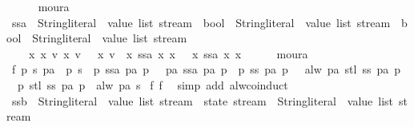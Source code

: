 \begin{isabellebody}
\ \ \ \ \isamarkupfalse%
\ moura\isanewline
\ \ \isamarkupfalse%
\ ssa\ {\isacharcolon}{\isacharcolon}\ {\isachardoublequoteopen}{\isacharparenleft}{\isacharparenleft}String{\isachardot}literal\ {\isasymtimes}\ value\ list{\isacharparenright}\ stream\ {\isasymRightarrow}\ bool{\isacharparenright}\ {\isasymRightarrow}\ {\isacharparenleft}{\isacharparenleft}String{\isachardot}literal\ {\isasymtimes}\ value\ list{\isacharparenright}\ stream\ {\isasymRightarrow}\ bool{\isacharparenright}\ {\isasymRightarrow}\ {\isacharparenleft}String{\isachardot}literal\ {\isasymtimes}\ value\ list{\isacharparenright}\ stream{\isachardoublequoteclose}\ \isanewline
\ \ \ \ {\isachardoublequoteopen}{\isasymforall}x{}\ x{}{\isachardot}\ {\isacharparenleft}{\isasymexists}v{}{\isachardot}\ x{}\ v{}\ {\isasymand}\ {\isasymnot}\ x{}\ v{}{\isacharparenright}\ {\isacharequal}\ {\isacharparenleft}x{}\ {\isacharparenleft}ssa\ x{}\ x{}{\isacharparenright}\ {\isasymand}\ {\isasymnot}\ x{}\ {\isacharparenleft}ssa\ x{}\ x{}{\isacharparenright}{\isacharparenright}{\isachardoublequoteclose}\isanewline
\ \ \ \ \isamarkupfalse%
\ moura\isanewline
\ \ \isamarkupfalse%
\ \isamarkupfalse%
\ f{}{\isacharcolon}\ {\isachardoublequoteopen}{\isasymforall}p\ s\ pa{\isachardot}\ {\isasymnot}\ p\ s\ {\isasymor}\ p\ {\isacharparenleft}ssa\ pa\ p{\isacharparenright}\ {\isasymand}\ {\isasymnot}\ pa\ {\isacharparenleft}ssa\ pa\ p{\isacharparenright}\ {\isasymor}\ p\ {\isacharparenleft}ss\ pa\ p{\isacharparenright}\ {\isasymand}\ {\isasymnot}\ alw\ pa\ {\isacharparenleft}stl\ {\isacharparenleft}ss\ pa\ p{\isacharparenright}{\isacharparenright}\ {\isasymand}\ {\isasymnot}\ p\ {\isacharparenleft}stl\ {\isacharparenleft}ss\ pa\ p{\isacharparenright}{\isacharparenright}\ {\isasymor}\ alw\ pa\ s{\isachardoublequoteclose}\isanewline
{}\isamarkupfalse%
\ f{}\ f{}\ \isamarkupfalse%
\ {\isacharparenleft}simp\ add{\isacharcolon}\ alw{\isacharunderscore}coinduct{\isacharparenright}\isanewline
{}\isamarkupfalse%
\ ssb\ {\isacharcolon}{\isacharcolon}\ {\isachardoublequoteopen}{\isacharparenleft}{\isacharparenleft}String{\isachardot}literal\ {\isasymtimes}\ value\ list{\isacharparenright}\ stream\ {\isasymRightarrow}\ state\ stream{\isacharparenright}\ {\isasymRightarrow}\ {\isacharparenleft}String{\isachardot}literal\ {\isasymtimes}\ value\ list{\isacharparenright}\ stream{\isachardoublequoteclose}\ \isanewline

\end{isabellebody}
